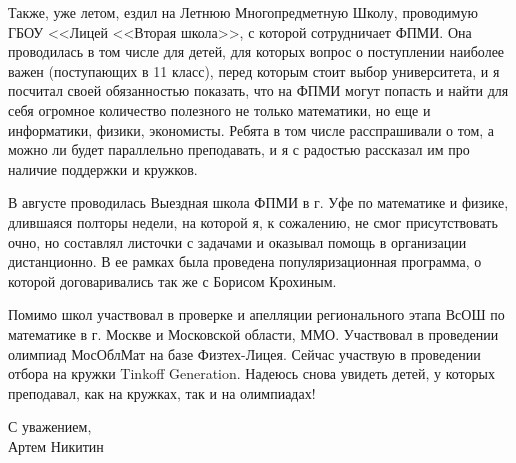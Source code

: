 \quad Также, уже летом, ездил на Летнюю Многопредметную Школу, проводимую ГБОУ <<Лицей <<Вторая школа>>, с которой сотрудничает ФПМИ. Она
проводилась в том числе для детей, для которых вопрос о поступлении наиболее важен (поступающих в 11 класс), перед которым стоит выбор
университета, и я посчитал своей обязанностью показать, что на ФПМИ могут попасть и найти для себя огромное количество полезного не только
математики, но еще и информатики, физики, экономисты. Ребята в том числе расспрашивали о том, а можно ли будет параллельно преподавать, и я с
радостью рассказал им про наличие поддержки и кружков.

\quad В августе проводилась Выездная школа ФПМИ в г. Уфе по математике и физике, длившаяся полторы недели, на которой я, к сожалению, не смог
присутствовать очно, но составлял листочки с задачами и оказывал помощь в организации дистанционно. В ее рамках была проведена
популяризационная программа, о которой договаривались так же с Борисом Крохиным.

\quad Помимо школ участвовал в проверке и апелляции регионального этапа ВсОШ по математике в г. Москве и Московской области, ММО. Участвовал в
проведении олимпиад МосОблМат на базе Физтех-Лицея. Сейчас участвую в проведении отбора на кружки Tinkoff Generation. Надеюсь снова увидеть
детей, у которых преподавал, как на кружках, так и на олимпиадах!

\begin{flushright}
    С уважением, \\
    Артем Никитин
\end{flushright}
